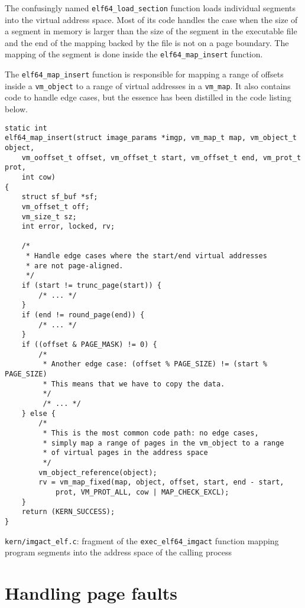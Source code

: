 \documentclass[shortabstract, english]{iithesis}
\begin{document}
The confusingly named \texttt{elf64_load_section} function loads
individual segments into the virtual address space. Most of its code handles the
case when the size of a segment in memory is larger than the size of the segment
in the executable file and the end of the mapping backed by the file is not on a
page boundary. The mapping of the segment is done inside the
\texttt{elf64_map_insert} function.

The \texttt{elf64_map_insert} function is responsible for mapping a range
of offsets inside a \texttt{vm_object} to a range of virtual addresses in
a \texttt{vm_map}. It also contains code to handle edge cases, but the
essence has been distilled in the code listing below.

\begin{listing}[H]
\begin{verbatim}
static int
elf64_map_insert(struct image_params *imgp, vm_map_t map, vm_object_t object,
    vm_ooffset_t offset, vm_offset_t start, vm_offset_t end, vm_prot_t prot,
    int cow)
{
    struct sf_buf *sf;
    vm_offset_t off;
    vm_size_t sz;
    int error, locked, rv;

    /*
     * Handle edge cases where the start/end virtual addresses
     * are not page-aligned.
     */
    if (start != trunc_page(start)) {
        /* ... */
    }
    if (end != round_page(end)) {
        /* ... */
    }
    if ((offset & PAGE_MASK) != 0) {
        /*
         * Another edge case: (offset % PAGE_SIZE) != (start % PAGE_SIZE)
         * This means that we have to copy the data.
         */
         /* ... */
    } else {
        /*
         * This is the most common code path: no edge cases,
         * simply map a range of pages in the vm_object to a range
         * of virtual pages in the address space
         */
        vm_object_reference(object);
        rv = vm_map_fixed(map, object, offset, start, end - start,
            prot, VM_PROT_ALL, cow | MAP_CHECK_EXCL);
    }
    return (KERN_SUCCESS);
}
\end{verbatim}
  \caption{\texttt{kern/imgact\_elf.c}: fragment of the
    \texttt{exec_elf64_imgact} function mapping program segments into the
    address space of the calling process}
\end{listing}

\section{Handling page faults}
\end{document}
